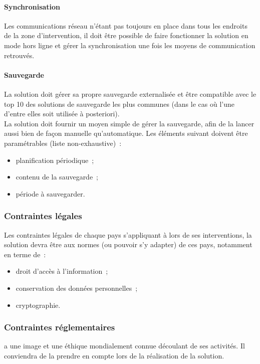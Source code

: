 \paragraph{Synchronisation}
Les communications réseau n'étant pas toujours en place dans tous les endroits de la zone d'intervention, il doit être possible de faire fonctionner la solution en mode \og{}hors ligne\fg{} et gérer la synchronisation une fois les moyens de communication retrouvés.

\paragraph{Sauvegarde}
La solution doit gérer sa propre sauvegarde externalisée et être compatible avec le top 10 des solutions de sauvegarde les plus communes (dans le cas où l'une d'entre elles soit utilisée à posteriori).
\\
La solution doit fournir un moyen simple de gérer la sauvegarde, afin de la lancer aussi bien de façon manuelle qu'automatique. Les éléments suivant doivent être paramétrables (liste non-exhaustive)~:
\begin{itemize}
\item planification périodique~;
\item contenu de la sauvegarde~;
\item période à sauvegarder.
\end{itemize}

\subsubsection{Contraintes légales}
Les contraintes légales de chaque pays s'appliquant à \mo lors de ses interventions, la solution devra être aux normes (ou pouvoir s'y adapter) de ces pays, notamment en terme de~:
\begin{itemize}
\item droit d'accès à l'information~;
\item conservation des données personnelles~;
\item cryptographie.
\end{itemize}

\subsubsection{Contraintes réglementaires}
\mo a une image et une éthique mondialement connue découlant de ses activités. Il conviendra de la prendre en compte lors de la réalisation de la solution.

